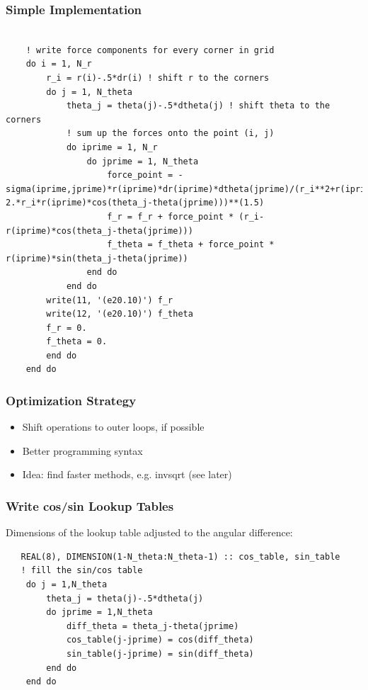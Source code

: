 \documentclass{beamer}
\begin{document}
\begin{frame}[fragile]
  \frametitle{Simple Implementation}
      
  \begin{lstlisting}
  
    ! write force components for every corner in grid
    do i = 1, N_r
        r_i = r(i)-.5*dr(i) ! shift r to the corners
        do j = 1, N_theta
            theta_j = theta(j)-.5*dtheta(j) ! shift theta to the corners
            ! sum up the forces onto the point (i, j)
            do iprime = 1, N_r
                do jprime = 1, N_theta
                    force_point = -sigma(iprime,jprime)*r(iprime)*dr(iprime)*dtheta(jprime)/(r_i**2+r(iprime)**2-2.*r_i*r(iprime)*cos(theta_j-theta(jprime)))**(1.5)
                    f_r = f_r + force_point * (r_i-r(iprime)*cos(theta_j-theta(jprime)))
                    f_theta = f_theta + force_point * r(iprime)*sin(theta_j-theta(jprime))
                end do
            end do
        write(11, '(e20.10)') f_r
        write(12, '(e20.10)') f_theta
        f_r = 0.
        f_theta = 0.
        end do
    end do
  \end{lstlisting}
\end{frame}
\begin{frame}
 \frametitle{Optimization Strategy}
 \begin{itemize}
  \item Shift operations to outer loops, if possible
  \item Better programming syntax
  \item Idea: find faster methods, e.g. invsqrt (see later)
 \end{itemize}

\end{frame}
\begin{frame}[fragile]
  \frametitle{Write cos/sin Lookup Tables}
  Dimensions of the lookup table adjusted to the angular difference:
  \begin{lstlisting}
   REAL(8), DIMENSION(1-N_theta:N_theta-1) :: cos_table, sin_table
   ! fill the sin/cos table
    do j = 1,N_theta
        theta_j = theta(j)-.5*dtheta(j)
        do jprime = 1,N_theta
            diff_theta = theta_j-theta(jprime)
            cos_table(j-jprime) = cos(diff_theta)
            sin_table(j-jprime) = sin(diff_theta)
        end do
    end do
  \end{lstlisting}

\end{frame}
\end{document}
